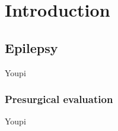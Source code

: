 \chapter{Introduction}
\label{chap:intro}
\minitoc


\section{Epilepsy}

Youpi


\subsection{Presurgical evaluation}

Youpi
